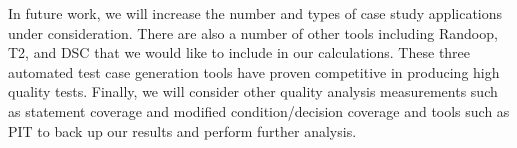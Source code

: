 In future work, we will increase the number and types of case study applications under consideration.  There are also a number of other tools including Randoop, T2, and DSC that we would like to include in our calculations.  These three automated test case generation tools have proven competitive in producing high quality tests.  Finally, we will consider other quality analysis measurements such as statement coverage and modified condition/decision coverage and tools such as PIT to back up our results and perform further analysis.  





